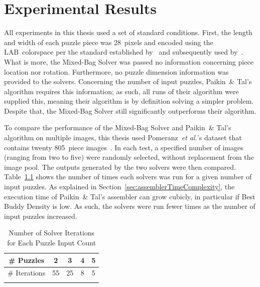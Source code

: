 \chapter{Experimental Results}\label{chap:experimentalResults}

All experiments in this thesis used a set of standard conditions.  First, the length and width of each puzzle piece was 28~pixels and encoded using the LAB~colorspace per the standard established by~\cite{cho2010} and subsequently used by~\cite{pomeranz2011, gallagher2012, sholomon2013, paikin2015}. What is more, the Mixed-Bag Solver was passed no information concerning piece location nor rotation.  Furthermore, no puzzle dimension information was provided to the solvers.  Concerning the number of input puzzles, Paikin~\& Tal's algorithm requires this information; as such, all runs of their algorithm were supplied this, meaning their algorithm is by definition solving a simpler problem.  Despite that, the Mixed-Bag Solver still significantly outperforms their algorithm.

To compare the performance of the Mixed-Bag Solver and Paikin~\& Tal's algorithm on multiple images, this thesis used Pomeranz~\textit{et al.}'s dataset that contains twenty 805~piece images~\cite{pomeranzBenchmarkImages}.  In each test, a specified number of images (ranging from two to five) were randomly selected, without replacement from the image pool.  The outputs generated by the two solvers were then compared.  Table~\ref{tab:numberSolverIterations} shows the number of times each solvers was run for a given number of input puzzles. As explained in Section~\ref{sec:assemblerTimeComplexity}, the execution time of Paikin~\& Tal's assembler can grow cubicly, in particular if Best Buddy Density is low.  As such, the solvers were run fewer times as the number of input puzzles increased.

\begin{table}[tb]
\begin{center}
\begin{tabular}{ |c||c|c|c|c| } 
 \Xhline{1pt}
 \# Puzzles    &  2 &  3 & 4 & 5 \\ 
\hline \hline
 \# Iterations & 55 & 25 & 8 & 5 \\ 
 \Xhline{1pt}
\end{tabular}
\end{center}
\caption{Number of Solver Iterations for Each Puzzle Input Count}\label{tab:numberSolverIterations}
\end{table}

